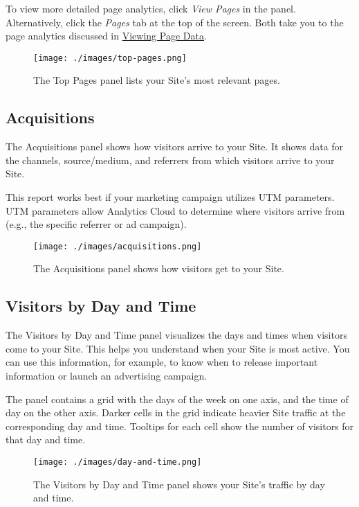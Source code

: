To view more detailed page analytics, click \emph{View Pages} in the
panel. Alternatively, click the \emph{Pages} tab at the top of the
screen. Both take you to the page analytics discussed in
\hyperref[viewing-page-data]{Viewing Page Data}.

\begin{figure}
\centering
\texttt{[image: ./images/top-pages.png]}
\caption{The Top Pages panel lists your Site's most relevant pages.}
\end{figure}

\subsection{Acquisitions}\label{acquisitions}

The Acquisitions panel shows how visitors arrive to your Site. It shows
data for the channels, source/medium, and referrers from which visitors
arrive to your Site.

This report works best if your marketing campaign utilizes UTM
parameters. UTM parameters allow Analytics Cloud to determine where
visitors arrive from (e.g., the specific referrer or ad campaign).

\begin{figure}
\centering
\texttt{[image: ./images/acquisitions.png]}
\caption{The Acquisitions panel shows how visitors get to your Site.}
\end{figure}

\subsection{Visitors by Day and Time}\label{visitors-by-day-and-time}

The Visitors by Day and Time panel visualizes the days and times when
visitors come to your Site. This helps you understand when your Site is
most active. You can use this information, for example, to know when to
release important information or launch an advertising campaign.

The panel contains a grid with the days of the week on one axis, and the
time of day on the other axis. Darker cells in the grid indicate heavier
Site traffic at the corresponding day and time. Tooltips for each cell
show the number of visitors for that day and time.

\begin{figure}
\centering
\texttt{[image: ./images/day-and-time.png]}
\caption{The Visitors by Day and Time panel shows your Site's traffic by
day and time.}
\end{figure}

